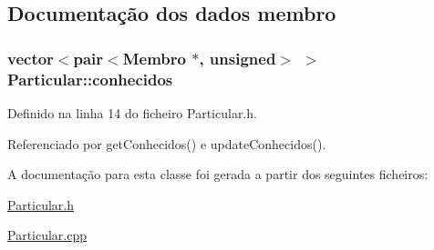 \subsection{Documentação dos dados membro}
\hypertarget{class_particular_aa7275585be06abbb131d9acda989847d}{
\subsubsection[{conhecidos}]{\setlength{\rightskip}{0pt plus 5cm}vector$<$pair$<${\bf Membro} $\ast$, unsigned$>$ $>$ Particular\+::conhecidos\hspace{0.3cm}{\ttfamily [private]}}}\label{class_particular_aa7275585be06abbb131d9acda989847d}


Definido na linha 14 do ficheiro Particular.\+h.



Referenciado por get\+Conhecidos() e update\+Conhecidos().



A documentação para esta classe foi gerada a partir dos seguintes ficheiros\+:\begin{DoxyCompactItemize}
\item 
\hyperlink{_particular_8h}{Particular.\+h}\item 
\hyperlink{_particular_8cpp}{Particular.\+cpp}\end{DoxyCompactItemize}
